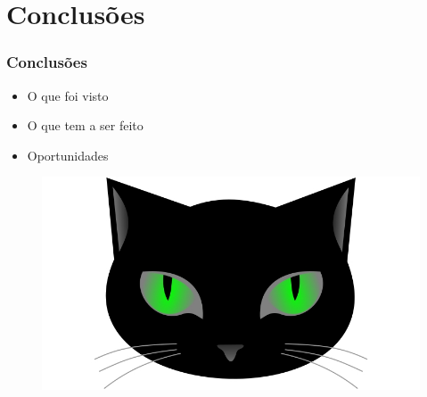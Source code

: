 \section{Conclusões}
\begin{frame}[fragile]
\frametitle{Conclusões}
\begin{minipage}{0.47\textwidth}
    \begin{itemize}
        \item O que foi visto
        \item O que tem a ser feito
        \item Oportunidades
    \end{itemize}
\end{minipage}
\begin{minipage}{0.5\textwidth}
\begin{figure}[ht!]
\begin{center}
\includegraphics[width=1.2\textwidth, height=0.40\textheight]{figures/logo_picat_alex.jpg}
\end{center}
\end{figure}
\end{minipage}
\end{frame}
